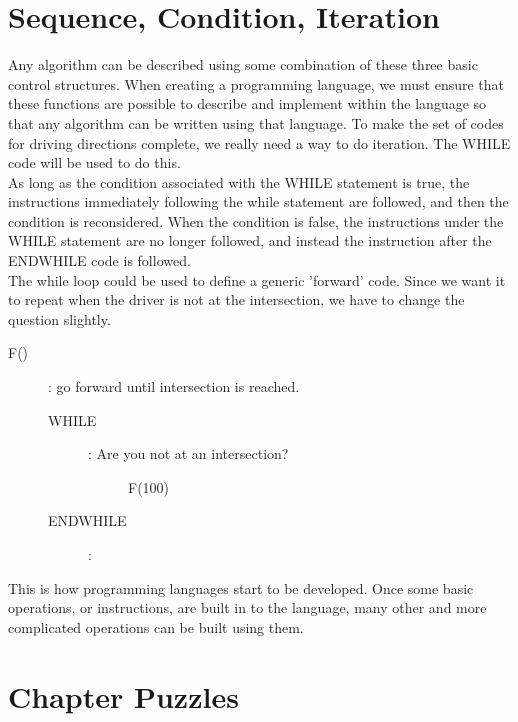 \begin{center} \end{center}

\section{Sequence, Condition, Iteration}

Any algorithm can be described using some combination of these three basic control structures. When creating a programming language, we must ensure that these functions are possible to describe and implement within the language so that any algorithm can be written using that language. To make the set of codes for driving directions complete, we really need a way to do iteration. The WHILE code will be used to do this.\\

As long as the condition associated with the WHILE statement is true, the instructions immediately following the while statement are followed, and then the condition is reconsidered. When the condition is false, the instructions under the WHILE statement are no longer followed, and instead the instruction after the ENDWHILE code is followed.\\

The while loop could be used to define a generic 'forward' code. Since we want it to repeat when the driver is not at the intersection, we have to change the question slightly.\\

\begin{description}
	\item[F()] : go forward until intersection is reached.
	\begin{description}
		\item[WHILE]: Are you not at an intersection?
		\begin{description}
			\item[] F(100)
		\end{description}
		\item[ENDWHILE]:
	\end{description}
\end{description}

This is how programming languages start to be developed. Once some basic operations, or instructions, are built in to the language, many other and more complicated operations can be built using them.

\section{Chapter Puzzles}

